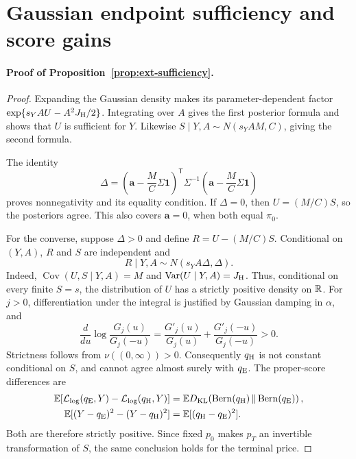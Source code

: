\section{Gaussian endpoint sufficiency and score gains}
\label{app:gaussian-extension}
\paragraph{Proof of Proposition~\ref{prop:ext-sufficiency}.}
\begin{proof}
Expanding the Gaussian density makes its parameter-dependent factor
$\exp\{s_Y A U-A^2J_{\rm H}/2\}$. Integrating over $A$ gives the first
posterior formula and shows that $U$ is sufficient for $Y$.
Likewise $S\mid Y,A\sim N(s_Y AM,C)$, giving the second formula.

The identity
\[
 \Delta=
 \left(\boldsymbol a-\frac MC\Sigma\boldsymbol1\right)^\mathsf T
 \Sigma^{-1}
 \left(\boldsymbol a-\frac MC\Sigma\boldsymbol1\right)
\]
proves nonnegativity and its equality condition. If $\Delta=0$, then
$U=(M/C)S$, so the posteriors agree. This also covers
$\boldsymbol a=0$, when both equal $\pi_0$.

For the converse, suppose $\Delta>0$ and define
$R=U-(M/C)S$. Conditional on $(Y,A)$, $R$ and $S$ are independent and
\begin{equation}
 R\mid Y,A\sim N(s_Y A\Delta,\Delta).
 \label{eq:ext-residual}
\end{equation}
Indeed, $\operatorname{Cov}(U,S\mid Y,A)=M$ and
$\operatorname{Var}(U\mid Y,A)=J_{\rm H}$. Thus, conditional on every finite
$S=s$, the distribution of $U$ has a strictly positive density on $\mathbb R$.
For $j>0$, differentiation under the integral is justified by Gaussian
damping in $\alpha$, and
\[
 \frac{d}{du}\log\frac{G_j(u)}{G_j(-u)}
 =\frac{G'_j(u)}{G_j(u)}+\frac{G'_j(-u)}{G_j(-u)}>0.
\]
Strictness follows from $\nu((0,\infty))>0$. Consequently $q_{\rm H}$ is not
constant conditional on $S$, and cannot agree almost surely with $q_{\rm E}$.
The proper-score differences are
\begin{align*}
 \mathbb E[\mathcal L_{\log}(q_{\rm E},Y)-\mathcal L_{\log}(q_{\rm H},Y)]
 &=\mathbb ED_{\mathrm{KL}}\!\left(\operatorname{Bern}(q_{\rm H})\,
       \middle\|\,\operatorname{Bern}(q_{\rm E})\right),\\
 \mathbb E[(Y-q_{\rm E})^2-(Y-q_{\rm H})^2]
 &=\mathbb E[(q_{\rm H}-q_{\rm E})^2].
\end{align*}
Both are therefore strictly positive. Since fixed $p_0$ makes $p_T$ an
invertible transformation of $S$, the same conclusion holds for the terminal
price.
\end{proof}
